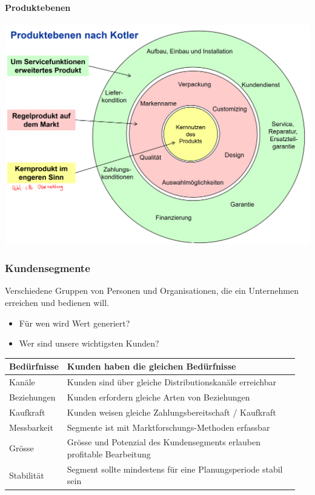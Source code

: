 \paragraph{Produktebenen}
\includegraphics[width=0.5\linewidth]{images/Produktebenen}

\subsubsection{Kundensegmente}
Verschiedene Gruppen von Personen und Organisationen, die ein Unternehmen erreichen und bedienen will.
\begin{itemize}
	\item Für wen wird Wert generiert?
	\item Wer sind unsere wichtigsten Kunden?
\end{itemize}

\begin{tabular}{|p{0.1\linewidth}|p{0.85\linewidth}|}
	\hline 
	Bedürfnisse & Kunden haben die gleichen Bedürfnisse\\ \hline
	Kanäle & Kunden sind über gleiche Distributionskanäle erreichbar\\ \hline
	Beziehungen & Kunden erfordern gleiche Arten von Beziehungen\\ \hline
	Kaufkraft & Kunden weisen gleiche Zahlungsbereitschaft / Kaufkraft\\ \hline
	Messbarkeit & Segmente ist mit Marktforschungs-Methoden erfassbar\\ \hline
	Grösse & Grösse und Potenzial des Kundensegments erlauben profitable Bearbeitung\\ \hline
	Stabilität & Segment sollte mindestens für eine Planungsperiode stabil sein\\ \hline
\end{tabular} 

